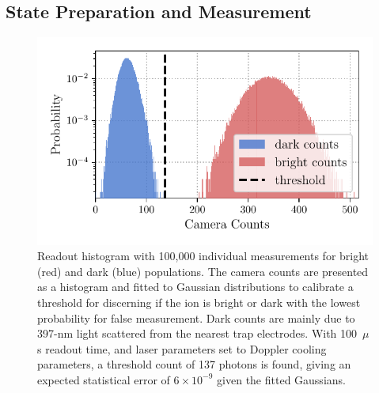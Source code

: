 \subsection{State Preparation and Measurement}
    \begin{figure}
        \begin{center}
        \noindent\includegraphics[width=0.75\linewidth]{
            figures/pdf_figure/readout_hist.pdf
            }
        \end{center}
        \caption{
            Readout histogram with 100,000 individual measurements for bright (red) and dark (blue) populations. The camera counts are presented as a histogram and fitted to Gaussian distributions to calibrate a threshold for discerning if the ion is bright or dark with the lowest probability for false measurement. Dark counts are mainly due to 397-nm light scattered from the nearest trap electrodes. With 100~$\mu$s readout time, and laser parameters set to Doppler cooling parameters, a threshold count of 137 photons is found, giving an expected statistical error of $6\times 10^{-9}$ given the fitted Gaussians. %
            }
        \label{fig:readout_histogram}
    \end{figure}


